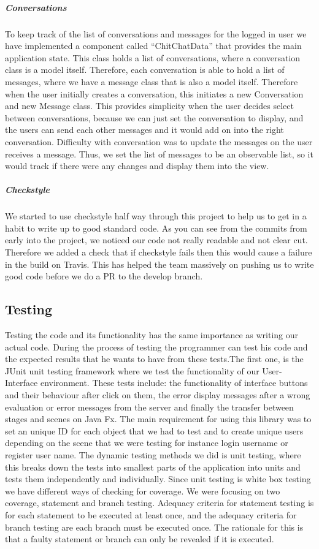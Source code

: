 \documentclass[11pt,a4paper]{report}
\begin{document}
\subparagraph{Conversations}
To keep track of the list of conversations and messages for the logged in user we have implemented a component called “ChitChatData” that provides the main application state. This class holds a list of conversations, where a conversation class is a model itself. Therefore, each conversation is able to hold a list of messages, where we have a message class that is also a model itself. Therefore when the user initially creates a conversation, this initiates a new Conversation and new Message class. This provides simplicity when the user decides select between conversations, because we can just set the conversation to display, and the users can send each other messages and it would add on into the right conversation. Difficulty with conversation was to update the messages on the user receives a message. Thus, we set the list of messages to be an observable list, so it would track if there were any changes and display them into the view.

\subparagraph{Checkstyle}
We started to use checkstyle half way through this project to help us to get in a habit to write up to good standard code. As you can see from the commits from early into the project, we noticed our code not really readable and not clear cut. Therefore we added a check that if checkstyle fails then this would cause a failure in the build on Travis. This has helped the team massively on pushing us to write good code before we do a PR to the develop branch.

\subsection{Testing}
Testing the code and its functionality has the same importance as writing our actual code. During the process of testing the programmer can test his code and the expected results that he wants to have from these tests.The first one, is the JUnit unit testing framework where we test the functionality of our User-Interface environment. These tests include: the functionality of interface buttons and their behaviour after click on them, the error display messages after a wrong evaluation or error messages from the server and finally the transfer between stages and scenes on Java Fx. The main requirement for using this library was to set an unique ID for each object that we had to test and to create unique users depending on the scene that we were testing for instance login username or register user name. The dynamic testing methods we did is unit testing, where this breaks down the tests into smallest parts of the application into units and tests them independently and individually. Since unit testing is white box testing we have different ways of checking for coverage. We were focusing on two coverage, statement and branch testing. Adequacy criteria for statement testing is for each statement to be executed at least once, and the adequacy criteria for branch testing are each branch must be executed once. The rationale for this is that a faulty statement or branch can only be revealed if it is executed.
\end{document}
